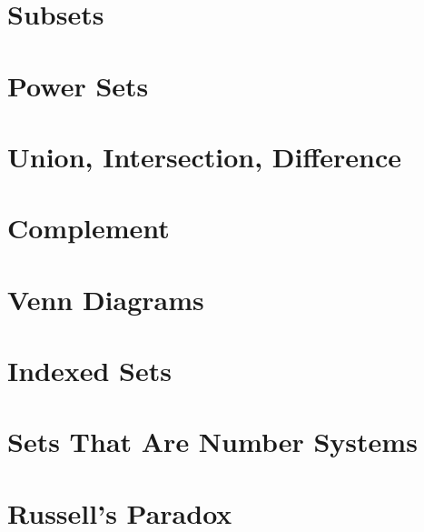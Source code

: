 \documentclass[../Latex-Setup/setup.tex]{subfiles}
\begin{document}
\section{Subsets}
\section{Power Sets}
\section{Union, Intersection, Difference}
\section{Complement}
\section{Venn Diagrams}
\section{Indexed Sets}
\section{Sets That Are Number Systems}
\section{Russell's Paradox}
\end{document}
